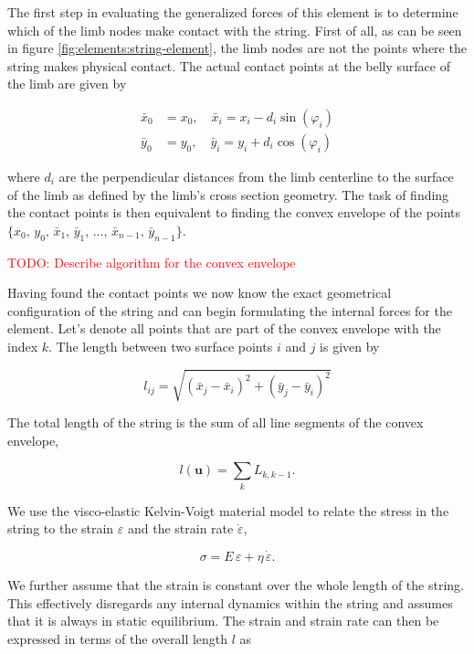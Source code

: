 The first step in evaluating the generalized forces of this element is to determine which of the limb nodes make contact with the string.
First of all, as can be seen in figure \ref{fig:elements:string-element}, the limb nodes are not the points where the string makes physical contact.
The actual contact points at the belly surface of the limb are given by

\begin{align}
\bar{x}_{0} &= x_{0}, \quad \bar{x}_{i} = x_{i} - d_{i}\sin(\varphi_{i}) \\
\bar{y}_{0} &= y_{0}, \quad \bar{y}_{i} = y_{i} + d_{i}\cos(\varphi_{i})
\end{align}

where $d_{i}$ are the perpendicular distances from the limb centerline to the surface of the limb as defined by the limb's cross section geometry.
The task of finding the contact points is then equivalent to finding the convex envelope of the points $\{x_{0},\,y_{0},\,\bar{x}_{1},\,\bar{y}_{1},\,\ldots,\,\bar{x}_{n-1},\,\bar{y}_{n-1}\}$.

\textcolor{red}{TODO: Describe algorithm for the convex envelope}

Having found the contact points we now know the exact geometrical configuration of the string and can begin formulating the internal forces for the element.
Let's denote all points that are part of the convex envelope with the index $k$.
The length between two surface points $i$ and $j$ is given by

\begin{equation}
l_{ij} = \sqrt{(\bar{x}_j - \bar{x}_i)^2 + (\bar{y}_j - \bar{y}_i)^2}
\end{equation}

The total length of the string is the sum of all line segments of the convex envelope,

\begin{equation}
l(\boldsymbol{u}) = \sum_{k} L_{k,k-1}.
\end{equation}

We use the visco-elastic Kelvin-Voigt material model to relate the stress in the string to the strain $\varepsilon$ and the strain rate $\dot{\varepsilon}$,

\begin{equation}
\sigma = E\,\varepsilon + \eta\,\dot{\varepsilon}.
\end{equation}

We further assume that the strain is constant over the whole length of the string.
This effectively disregards any internal dynamics within the string and assumes that it is always in static equilibrium.
The strain and strain rate can then be expressed in terms of the overall length $l$ as

